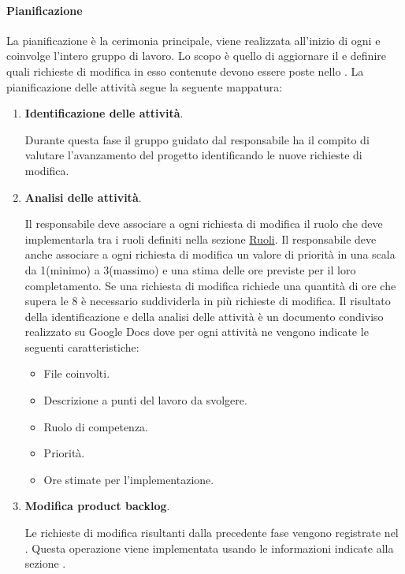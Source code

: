 \paragraph{Pianificazione}
La pianificazione è la cerimonia principale, viene realizzata all’inizio di ogni  e coinvolge l'intero gruppo di lavoro.
Lo scopo è quello di aggiornare il  e definire quali richieste di modifica in esso contenute devono essere poste nello .
La pianificazione delle attività segue la seguente mappatura:
\begin{enumerate}
    \item \textbf{Identificazione delle attività}.
    
    Durante questa fase il gruppo guidato dal responsabile ha il compito di valutare l’avanzamento del progetto identificando le nuove richieste di modifica.

    \item \textbf{Analisi delle attività}.
    
    Il responsabile deve associare a ogni richiesta di modifica il ruolo che deve implementarla tra i ruoli definiti nella sezione \hyperref[subsubsec:ruoli]{Ruoli}.
    Il responsabile deve anche associare a ogni richiesta di modifica un valore di priorità in una scala da 1(minimo) a 3(massimo) e una stima delle ore previste per il loro completamento.
    Se una richiesta di modifica richiede una quantità di ore che supera le 8 è necessario suddividerla in più richieste di modifica.
    Il risultato della identificazione e della analisi delle attività è un documento condiviso realizzato su Google Docs dove per ogni attività ne vengono indicate le seguenti caratteristiche:
    \begin{itemize}
        \item File coinvolti.
        \item Descrizione a punti del lavoro da svolgere.
        \item Ruolo di competenza.
        \item Priorità.
        \item Ore stimate per l'implementazione.
    \end{itemize}

    \item \textbf{Modifica product backlog}.
    
    Le richieste di modifica risultanti dalla precedente fase vengono registrate nel .
    Questa operazione viene implementata usando le informazioni indicate alla sezione \hyperref[subpar:ITS]{}.



\end{enumerate}
